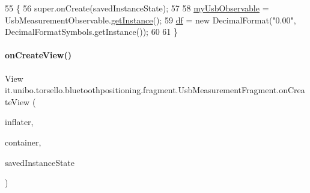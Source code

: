 \begin{DoxyCode}
55                                                               \{
56         super.onCreate(savedInstanceState);
57 
58         \hyperlink{classit_1_1unibo_1_1torsello_1_1bluetoothpositioning_1_1fragment_1_1UsbMeasurementFragment_adefc2433786f22fffe560fadefec9e2c_adefc2433786f22fffe560fadefec9e2c}{myUsbObservable} = UsbMeasurementObservable.\hyperlink{classit_1_1unibo_1_1torsello_1_1bluetoothpositioning_1_1observables_1_1UsbMeasurementObservable_aff4f89490f3f2c11ca4feea933d12d88_aff4f89490f3f2c11ca4feea933d12d88}{getInstance}();
59         \hyperlink{classit_1_1unibo_1_1torsello_1_1bluetoothpositioning_1_1fragment_1_1UsbMeasurementFragment_ac5ba3cb6fe1660a73d01bf970c60922b_ac5ba3cb6fe1660a73d01bf970c60922b}{df} = \textcolor{keyword}{new} DecimalFormat(\textcolor{stringliteral}{"0.00"}, DecimalFormatSymbols.getInstance());
60 
61     \}
\end{DoxyCode}
\hypertarget{classit_1_1unibo_1_1torsello_1_1bluetoothpositioning_1_1fragment_1_1UsbMeasurementFragment_a43be96dbfa04a7c353402ca6ade9ae83_a43be96dbfa04a7c353402ca6ade9ae83}{}\label{classit_1_1unibo_1_1torsello_1_1bluetoothpositioning_1_1fragment_1_1UsbMeasurementFragment_a43be96dbfa04a7c353402ca6ade9ae83_a43be96dbfa04a7c353402ca6ade9ae83} 
\paragraph{\texorpdfstring{on\+Create\+View()}{onCreateView()}}
{\footnotesize\ttfamily View it.\+unibo.\+torsello.\+bluetoothpositioning.\+fragment.\+Usb\+Measurement\+Fragment.\+on\+Create\+View (\begin{DoxyParamCaption}\item[{Layout\+Inflater}]{inflater,  }\item[{View\+Group}]{container,  }\item[{Bundle}]{saved\+Instance\+State }\end{DoxyParamCaption})}


